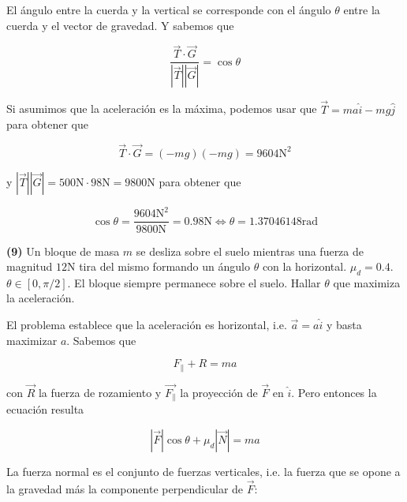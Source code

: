 \documentclass[12pt]{article}
\theoremstyle{definition}
\begin{document}
El ángulo entre la cuerda y la vertical se corresponde con el ángulo $\theta$
entre la cuerda y el vector de gravedad. Y sabemos que 

\begin{equation*}
    \frac{\vec{T} \cdot \vec{G}}{|\vec{T}| |\vec{G}|} = \cos \theta
\end{equation*}

Si asumimos que la aceleración es la máxima, podemos usar que $\vec{T} = ma
\hat{i} - mg \hat{j}$ para obtener que 

\begin{equation*}
    \vec{T} \cdot \vec{G} = (-mg)(-mg) = 9604\text{N}^2
\end{equation*}

y $\left| \vec{T} \right| \left| \vec{G} \right| = 500\text{N} \cdot 98\text{N}
= 9800\text{N}$ para obtener que 

\begin{equation*}
    \cos \theta = \frac{9604\text{N}^2}{9800\text{N}}= 0.98\text{N} \iff \theta
    = 1.37046148\text{rad}
\end{equation*}
\pagebreak 

\pagebreak 

\begin{shaded}
    \textbf{(9)} Un bloque de masa $m$ se desliza sobre el suelo mientras una
    fuerza de magnitud $12$N tira del mismo formando un ángulo $\theta$ con la
    horizontal. $\mu_d = 0.4$. $\theta \in [0, \pi / 2]$. El bloque siempre
    permanece sobre el suelo. Hallar $\theta$  que maximiza la aceleración.
\end{shaded}


El problema establece que la aceleración es horizontal, i.e. $\vec{a} = a
\hat{i}$ y basta maximizar $a$. Sabemos que 

\begin{equation*}
    F_{\parallel} + R = ma \end{equation*}

con $\vec{R}$ la fuerza de rozamiento y $\vec{F_{\parallel}}$ la proyección de
$\vec{F}$ en $\hat{i}$. Pero entonces la ecuación resulta

\begin{equation*}
    \left| \vec{F} \right| \cos \theta + \mu_d\left| \vec{N} \right|  = ma
\end{equation*}

La fuerza normal es el conjunto de fuerzas verticales, i.e. la fuerza que se
opone a la gravedad más la componente
perpendicular de $\vec{F}$:
\end{document}
